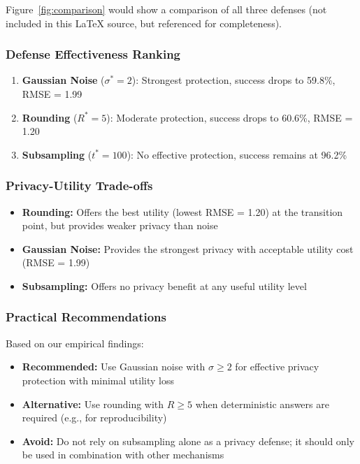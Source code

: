 \documentclass[11pt,letterpaper]{article}
\begin{document}
Figure~\ref{fig:comparison} would show a comparison of all three defenses (not included in this LaTeX source, but referenced for completeness).

\subsubsection{Defense Effectiveness Ranking}

\begin{enumerate}[leftmargin=*]
    \item \textbf{Gaussian Noise} ($\sigma^* = 2$): Strongest protection, success drops to 59.8\%, RMSE = 1.99
    \item \textbf{Rounding} ($R^* = 5$): Moderate protection, success drops to 60.6\%, RMSE = 1.20
    \item \textbf{Subsampling} ($t^* = 100$): No effective protection, success remains at 96.2\%
\end{enumerate}

\subsubsection{Privacy-Utility Trade-offs}

\begin{itemize}[leftmargin=*]
    \item \textbf{Rounding:} Offers the best utility (lowest RMSE = 1.20) at the transition point, but provides weaker privacy than noise
    \item \textbf{Gaussian Noise:} Provides the strongest privacy with acceptable utility cost (RMSE = 1.99)
    \item \textbf{Subsampling:} Offers no privacy benefit at any useful utility level
\end{itemize}

\subsubsection{Practical Recommendations}

Based on our empirical findings:

\begin{itemize}[leftmargin=*]
    \item \textbf{Recommended:} Use Gaussian noise with $\sigma \geq 2$ for effective privacy protection with minimal utility loss
    \item \textbf{Alternative:} Use rounding with $R \geq 5$ when deterministic answers are required (e.g., for reproducibility)
    \item \textbf{Avoid:} Do not rely on subsampling alone as a privacy defense; it should only be used in combination with other mechanisms
\end{itemize}
\end{document}
